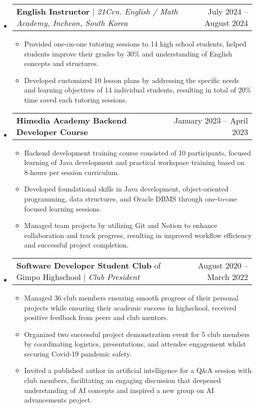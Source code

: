 \documentclass[letterpaper,11pt]{article}
\makeatletter
\newcommand{\resumeItem}[1]{
  \item\small{
    {#1 \vspace{-5pt}}
  }
}
\newcommand{\resumeProjectHeading}[2]{
    \item
    \begin{tabular*}{0.97\textwidth}{l@{\extracolsep{\fill}}r@{\hspace{-0.2in}}}
        \small#1 & #2 \\
    \end{tabular*}\vspace{-7pt}
}
\newcommand{\resumeSubHeadingListStart}{\begin{itemize}[leftmargin=0.00in, rightmargin=-0.2in, label={}]}
\newcommand{\resumeSubHeadingListEnd}{\end{itemize}}
\newcommand{\resumeItemListStart}{\begin{itemize}[leftmargin=0.15in, rightmargin=0.15in]}
\newcommand{\resumeItemListEnd}{\end{itemize}\vspace{-7pt}}
\makeatother
\begin{document}
    \resumeSubHeadingListStart
        \resumeProjectHeading
            {\textbf{English Instructor} $|$ \emph{21Cen. English / Math Academy, Incheon, South Korea}}{July 2024 -- August 2024}
            \resumeItemListStart
                \resumeItem{Provided one-on-one tutoring sessions to 14 high school students, helped students improve their grades by 30\% and understanding of English concepts and structures.}
                \resumeItem{Developed customized 10 lesson plans by addressing the specific needs and learning objectives of 14 individual students, resulting in total of 20\% time saved each tutoring sessions.}
            \resumeItemListEnd
        \resumeSubHeadingListEnd

    \resumeSubHeadingListStart
        \resumeProjectHeading
            {\textbf{Himedia Academy Backend Developer Course}}{January 2023 -- April 2023}
            \resumeItemListStart
                \resumeItem{Backend development training course consisted of 10 participants, focused learning of Java development and practical workspace training based on 8-hours per session curriculum.}
                \resumeItem{Developed foundational skills in Java development, object-oriented programming, data structures, and Oracle DBMS through one-to-one focused learning sessions.}
                \resumeItem{Managed team projects by utilizing Git and Notion to enhance collaboration and track progress, resulting in improved workflow efficiency and successful project completion.}
                \resumeItemListEnd
        \resumeSubHeadingListEnd

    \resumeSubHeadingListStart
        \resumeProjectHeading
            {\textbf{Software Developer Student Club} of Gimpo Highschool $|$ \emph{Club President}}{August 2020 -- March 2022}
            \resumeItemListStart
                \resumeItem{Managed 36 club members ensuring smooth progress of their personal projects while ensuring their academic success in highschool, received positive feedback from peers and club mentors.}
                \resumeItem{Organized two successful project demonstration event for 5 club members by coordinating logistics, presentations, and attendee engagement whilst securing Covid-19 pandemic safety.}
                \resumeItem{Invited a published author in artificial intelligence for a Q\&A session with club members, facilitating an engaging discussion that deepened understanding of AI concepts and inspired a new group on AI advancements project.}
            \resumeItemListEnd
        \resumeSubHeadingListEnd
\end{document}
